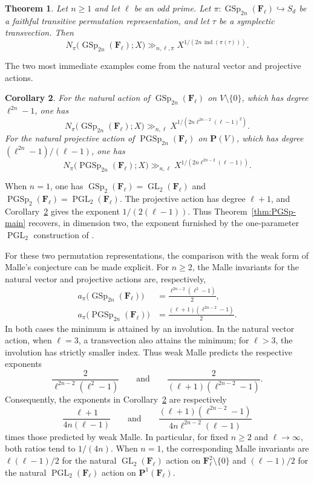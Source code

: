 \documentclass[11pt,hidelinks]{amsart}
\newtheorem{theorem}{Theorem}[section]
\newtheorem{corollary}[theorem]{Corollary}
\newcommand{\F}{\mathbf F}
\newcommand{\GL}{\operatorname{GL}}
\newcommand{\PGL}{\operatorname{PGL}}
\newcommand{\GSp}{\operatorname{GSp}}
\newcommand{\PGSp}{\operatorname{PGSp}}
\newcommand{\ind}{\operatorname{ind}}
\newcommand{\PP}{\mathbf P}
\begin{document}
\begin{theorem}\label{thm:GSp-main}
Let $n\geq 1$ and let $\ell$ be an odd prime. Let
$\pi:\GSp_{2n}(\F_\ell)\hookrightarrow S_d$ be a faithful transitive permutation representation, and let $\tau$ be a symplectic transvection. Then
\[
 N_\pi\bigl(\GSp_{2n}(\F_\ell);X\bigr)
 \gg_{n,\ell,\pi}
 X^{1/(2n\,\ind(\pi(\tau)))}.
\]
\end{theorem}

The two most immediate examples come from the natural vector and projective actions.

\begin{corollary}\label{cor:natural-actions}
For the natural action of $\GSp_{2n}(\F_\ell)$ on $V\setminus\{0\}$, which has degree $\ell^{2n}-1$, one has
\[
 N_\pi\bigl(\GSp_{2n}(\F_\ell);X\bigr)
 \gg_{n,\ell}
 X^{1/(2n\ell^{2n-2}(\ell-1)^2)}.
\]
For the natural projective action of $\PGSp_{2n}(\F_\ell)$ on $\PP(V)$, which has degree $(\ell^{2n}-1)/(\ell-1)$, one has
\[
 N_\pi\bigl(\PGSp_{2n}(\F_\ell);X\bigr)
 \gg_{n,\ell}
 X^{1/(2n\ell^{2n-2}(\ell-1))}.
\]
\end{corollary}

When $n=1$, one has $\GSp_2(\F_\ell)=\GL_2(\F_\ell)$ and $\PGSp_2(\F_\ell)=\PGL_2(\F_\ell)$. The projective action has degree $\ell+1$, and Corollary~\ref{cor:natural-actions} gives the exponent $1/(2(\ell-1))$. Thus Theorem~\ref{thm:PGSp-main} recovers, in dimension two, the exponent furnished by the one-parameter $\PGL_2$ construction of \cite{Cristante2025}.

For these two permutation representations, the comparison with the
weak form of Malle's conjecture can be made explicit.  For $n\geq 2$,
the Malle invariants for the natural vector and projective actions are,
respectively,
\begin{align*}
a_\pi\bigl(\GSp_{2n}(\F_\ell)\bigr)
&=\frac{\ell^{2n-2}(\ell^2-1)}{2},\\
a_\pi\bigl(\PGSp_{2n}(\F_\ell)\bigr)
&=\frac{(\ell+1)(\ell^{2n-2}-1)}{2}.
\end{align*}
In both cases the minimum is attained by an involution. In the natural
vector action, when $\ell=3$, a transvection also attains the minimum;
for $\ell>3$, the involution has strictly smaller index. Thus weak Malle
predicts the respective exponents
\[
\frac{2}{\ell^{2n-2}(\ell^2-1)}
\qquad\text{and}\qquad
\frac{2}{(\ell+1)(\ell^{2n-2}-1)}.
\]
Consequently, the exponents in Corollary~\ref{cor:natural-actions} are
respectively
\[
\frac{\ell+1}{4n(\ell-1)}
\qquad\text{and}\qquad
\frac{(\ell+1)(\ell^{2n-2}-1)}
{4n\ell^{2n-2}(\ell-1)}
\]
times those predicted by weak Malle.  In particular, for fixed
$n\geq2$ and $\ell\to\infty$, both ratios tend to $1/(4n)$.
When $n=1$, the corresponding Malle invariants are
$\ell(\ell-1)/2$ for the natural $\GL_2(\F_\ell)$ action on
$\F_\ell^2\setminus\{0\}$ and $(\ell-1)/2$ for the natural
$\PGL_2(\F_\ell)$ action on $\PP^1(\F_\ell)$.
\end{document}
